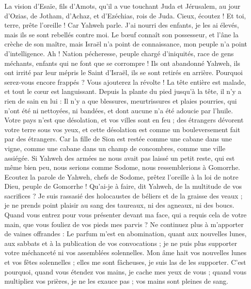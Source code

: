 \begin{multicols}{2}
\VerseOne{}La vision d'Esaïe, fils d'Amots, qu'il a vue touchant Juda et Jérusalem, au jour d'Ozias, de Jotham, d'Achaz, et d'Ezéchias, rois de Juda.
Cieux, écoutez ! Et toi, terre, prête l'oreille ! Car Yahweh parle. J'ai nourri des enfants, je les ai élevés, mais ils se sont rebellés contre moi.
Le bœuf connaît son possesseur, et l'âne la crèche de son maître, mais Israël n'a point de connaissance, mon peuple n'a point d'intelligence.
Ah ! Nation pécheresse, peuple chargé d'iniquités, race de gens méchants, enfants qui ne font que se corrompre ! Ils ont abandonné Yahweh, ils ont irrité par leur mépris le Saint d'Israël, ils se sont retirés en arrière.
Pourquoi serez-vous encore frappés ? Vous ajouterez la révolte ! La tête entière est malade, et tout le cœur est languissant.
Depuis la plante du pied jusqu'à la tête, il n'y a rien de sain en lui : Il n'y a que blessures, meurtrissures et plaies pourries, qui n'ont été ni nettoyées, ni bandées, et dont aucune n'a été adoucie par l'huile.
Votre pays n'est que désolation, et vos villes sont en feu ; des étrangers dévorent votre terre sous vos yeux, et cette désolation est comme un bouleversement fait par des étrangers.
Car la fille de Sion est restée comme une cabane dans une vigne, comme une cabane dans un champ de concombres, comme une ville assiégée.
Si Yahweh des armées ne nous avait pas laissé un petit reste, qui est même bien peu, nous serions comme Sodome, nous ressemblerions à Gomorrhe.
Ecoutez la parole de Yahweh, chefs de Sodome, prêtez l'oreille à la loi de notre Dieu, peuple de Gomorrhe !
Qu'ai-je à faire, dit Yahweh, de la multitude de vos sacrifices ? Je suis rassasié des holocaustes de béliers et de la graisse des veaux ; je ne prends point plaisir au sang des taureaux, ni des agneaux, ni des boucs.
Quand vous entrez pour vous présenter devant ma face, qui a requis cela de votre main, que vous fouliez de vos pieds mes parvis ?
Ne continuez plus à m'apporter de vaines offrandes : Le parfum m'est en abomination, quant aux nouvelles lunes, aux sabbats et à la publication de vos convocations ; je ne puis plus supporter votre méchanceté ni vos assemblées solennelles.
Mon âme hait vos nouvelles lunes et vos fêtes solennelles ; elles me sont fâcheuses, je suis las de les supporter.
C'est pourquoi, quand vous étendez vos mains, je cache mes yeux de vous ; quand vous multipliez vos prières, je ne les exauce pas ; vos mains sont pleines de sang.

\end{multicols}
